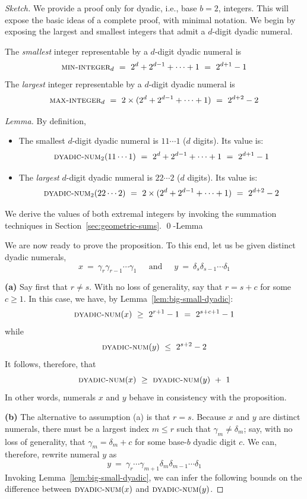 \begin{proof}[Sketch]
We provide a proof only for dyadic, i.e., base $b=2$, integers.  This
will expose the basic ideas of a complete proof, with minimal
notation.  We begin by exposing the largest and smallest integers that
admit a $d$-digit dyadic numeral.

\begin{lemma}
\label{lem:big-small-dyadic}
The {\em smallest} integer representable by a $d$-digit dyadic
numeral is 
\[ \mbox{\sc min-integer}_d \ = \ 2^d + 2^{d-1} + \cdots + 1 \ = \ 2^{d+1} - 1
\]
The {\em largest} integer representable by a $d$-digit dyadic
numeral is
\[ \mbox{\sc max-integer}_d \ = \
2 \times (2^d + 2^{d-1} + \cdots + 1) \ = \ 2^{d+2} - 2
\]
\end{lemma}

\begin{proof}[Lemma]
By definition,
\begin{itemize}
\item
The smallest $d$-digit dyadic numeral is $11 \cdots 1$ ($d$ digits).
Its value is:
\[ \mbox{\sc dyadic-num}_2(11 \cdots 1)
 \ = \ 2^d + 2^{d-1} + \cdots + 1 \ = \ 2^{d+1} - 1 \]
\item
The {\em largest} $d$-digit dyadic numeral is 
$22 \cdots 2$ ($d$ digits).  Its value is:
\[ \mbox{\sc dyadic-num}_2(22 \cdots 2)
\ = \ 2 \times (2^d + 2^{d-1} + \cdots + 1) \ = \ 2^{d+2} - 2 \]
\end{itemize}
We derive the values of both extremal integers by invoking the
summation techniques in Section~\ref{sec:geometric-sums}.
\qed-Lemma
\end{proof}

\bigskip

We are now ready to prove the proposition.  To this end, let us be
given distinct dyadic numerals,
\[
x \ = \ \gamma_r \gamma_{r-1} \cdots \gamma_1
 \ \ \ \ \ \mbox{ and } \ \ \ \ \
y \ = \ \delta_s \delta_{s-1} \cdots \delta_1
\]

{\bf (a)} Say first that $r \neq s$.  With no loss of generality, say
that $r = s +c$ for some $c \geq 1$.  In this case, we have, by
Lemma~\ref{lem:big-small-dyadic}:
\[ \mbox{\sc dyadic-num}(x) \ \geq \ 2^{r+1} - 1 \ = \ 2^{s+c+1} -1 \]
while
\[ \mbox{\sc dyadic-num}(y) \ \leq \ 2^{s+2} - 2 \]
It follows, therefore, that
\[ \mbox{\sc dyadic-num}(x) \ \geq \ \mbox{\sc dyadic-num}(y) \ + \ 1 \]
In other words, numerals $x$ and $y$ behave in consistency with the proposition.

{\bf (b)} The alternative to assumption (a) is that $r = s$.  Because
$x$ and $y$ are distinct numerals, there must be a largest index $m
\leq r$ such that $\gamma_m \neq \delta_m$; say, with no loss of
generality, that $\gamma_m = \delta_m + c$ for some base-$b$ dyadic
digit $c$.  We can, therefore, rewrite numeral $y$ as
\[ y \ = \ \gamma_r \cdots \gamma_{m+1} \delta_m \delta_{m-1} \cdots \delta_1
\]
Invoking Lemma~\ref{lem:big-small-dyadic}, we can infer the following
bounds on the difference between $\mbox{\sc dyadic-num}(x)$ and
$\mbox{\sc dyadic-num}(y)$.


\end{proof}
